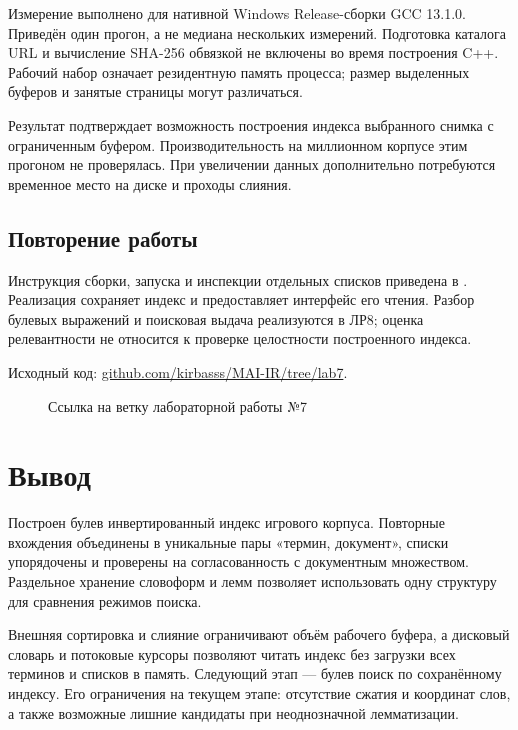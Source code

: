 \documentclass[12pt,a4paper]{article}
\begin{document}
Измерение выполнено для нативной Windows Release-сборки GCC 13.1.0.
Приведён один прогон, а не медиана нескольких измерений.
Подготовка каталога URL и вычисление SHA-256 обвязкой не включены
во время построения C++. Рабочий набор означает резидентную память
процесса; размер выделенных буферов и занятые страницы могут различаться.

Результат подтверждает возможность построения индекса выбранного снимка
с ограниченным буфером. Производительность на миллионном корпусе
этим прогоном не проверялась. При увеличении данных дополнительно
потребуются временное место на диске и проходы слияния.

\subsection{Повторение работы}
Инструкция сборки, запуска и инспекции отдельных списков приведена
в . Реализация сохраняет индекс и предоставляет
интерфейс его чтения. Разбор булевых выражений и поисковая выдача
реализуются в ЛР8; оценка релевантности не относится к проверке
целостности построенного индекса.

Исходный код:
\href{https://github.com/kirbasss/MAI-IR/tree/lab7}{github.com/kirbasss/MAI-IR/tree/lab7}.
\begin{figure}[H]
\centering
\begingroup
\hypersetup{urlcolor=black}
\endgroup
\caption{Ссылка на ветку лабораторной работы №7}
\end{figure}

\section{Вывод}
Построен булев инвертированный индекс игрового корпуса.
Повторные вхождения объединены в уникальные пары «термин, документ»,
списки упорядочены и проверены на согласованность с документным множеством.
Раздельное хранение словоформ и лемм позволяет использовать одну структуру
для сравнения режимов поиска.

Внешняя сортировка и слияние ограничивают объём рабочего буфера,
а дисковый словарь и потоковые курсоры позволяют читать индекс
без загрузки всех терминов и списков в память. Следующий этап ---
булев поиск по сохранённому индексу. Его ограничения на текущем этапе:
отсутствие сжатия и координат слов, а также возможные лишние кандидаты
при неоднозначной лемматизации.
\end{document}
